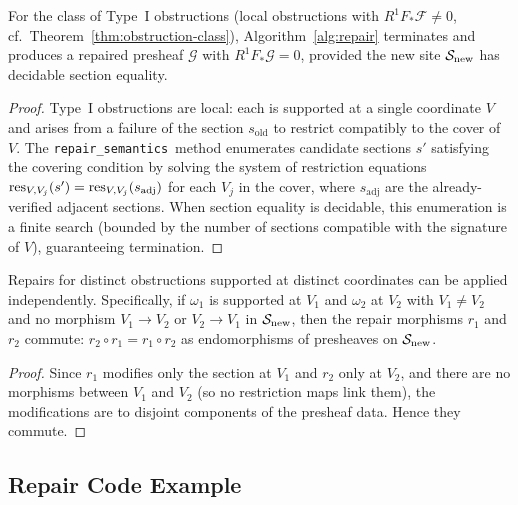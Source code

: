 \documentclass[11pt]{article}
\newcommand{\RepairSem}{\texttt{repair\_semantics}}
\newcommand{\SiteNew}{\Site_{\mathrm{new}}}
\newcommand{\Pushforward}{F_*}
\begin{document}
\begin{theorem}\label{thm:repair-completeness}
For the class of Type~I obstructions (local obstructions with
$R^1\Pushforward\mathcal{F} \neq 0$, cf.\
Theorem~\ref{thm:obstruction-class}), Algorithm~\ref{alg:repair} terminates
and produces a repaired presheaf $\mathcal{G}$ with
$R^1\Pushforward\mathcal{G} = 0$, provided the new site $\SiteNew$ has
decidable section equality.
\end{theorem}

\begin{proof}
Type~I obstructions are local: each is supported at a single coordinate
$V$ and arises from a failure of the section $s_{\mathrm{old}}$ to
restrict compatibly to the cover of $V$.  The \RepairSem\ method
enumerates candidate sections $s'$ satisfying the covering condition
by solving the system of restriction equations
$\mathrm{res}_{V, V_j}(s') = \mathrm{res}_{V, V_j}(s_{\mathrm{adj}})$ for each $V_j$
in the cover, where $s_{\mathrm{adj}}$ are the already-verified adjacent
sections.  When section equality is decidable, this enumeration is a
finite search (bounded by the number of sections compatible with the
signature of $V$), guaranteeing termination.
\end{proof}

\begin{proposition}\label{prop:repair-locality}
Repairs for distinct obstructions supported at distinct coordinates can be
applied independently.  Specifically, if $\omega_1$ is supported at $V_1$
and $\omega_2$ at $V_2$ with $V_1 \neq V_2$ and no morphism
$V_1 \to V_2$ or $V_2 \to V_1$ in $\SiteNew$, then the repair morphisms
$r_1$ and $r_2$ commute: $r_2 \circ r_1 = r_1 \circ r_2$ as
endomorphisms of presheaves on $\SiteNew$.
\end{proposition}

\begin{proof}
Since $r_1$ modifies only the section at $V_1$ and $r_2$ only at $V_2$,
and there are no morphisms between $V_1$ and $V_2$ (so no restriction maps
link them), the modifications are to disjoint components of the presheaf
data.  Hence they commute.
\end{proof}

\subsection{Repair Code Example}
\end{document}
